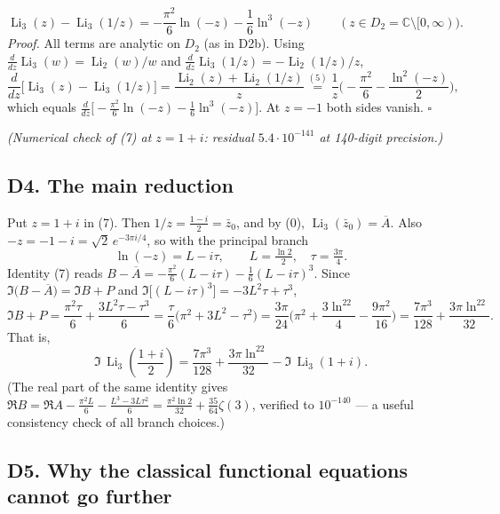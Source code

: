 \documentclass[11pt]{article}
\theoremstyle{remark}
\begin{document}
\begin{equation*}
\operatorname{Li}_3(z)-\operatorname{Li}_3(1/z)=-\frac{\pi^2}{6}\ln(-z)-\frac16\ln^3(-z)\qquad (z\in D_2=\mathbb{C}\setminus[0,\infty)). \tag{7}
\end{equation*}
\emph{Proof.} All terms are analytic on $D_2$ (as in D2b). Using $\tfrac{d}{dz}\operatorname{Li}_3(w)=\operatorname{Li}_2(w)/w$ and $\tfrac{d}{dz}\operatorname{Li}_3(1/z)=-\operatorname{Li}_2(1/z)/z$,
\[
\frac{d}{dz}\Big[\operatorname{Li}_3(z)-\operatorname{Li}_3(1/z)\Big]=\frac{\operatorname{Li}_2(z)+\operatorname{Li}_2(1/z)}{z}
\overset{(5)}{=}\frac1z\Big(-\frac{\pi^2}{6}-\frac{\ln^2(-z)}{2}\Big),
\]
which equals $\tfrac{d}{dz}\big[-\tfrac{\pi^2}6\ln(-z)-\tfrac16\ln^3(-z)\big]$. At $z=-1$ both sides vanish. $\square$

\emph{(Numerical check of (7) at $z=1+i$: residual $5.4\cdot10^{-141}$ at 140-digit precision.)}

\subsection*{D4. The main reduction}

Put $z=1+i$ in (7). Then $1/z=\tfrac{1-i}2=\bar z_0$, and by (0), $\operatorname{Li}_3(\bar z_0)=\overline A$. Also $-z=-1-i=\sqrt2\,e^{-3\pi i/4}$, so with the principal branch
\[
\ln(-z)=L-i\tau,\qquad L=\tfrac{\ln 2}{2},\quad \tau=\tfrac{3\pi}{4}.
\]
Identity (7) reads $B-\overline A=-\tfrac{\pi^2}6(L-i\tau)-\tfrac16(L-i\tau)^3$. Since $\Im\big(B-\overline A\big)=\Im B+P$ and $\Im\big[(L-i\tau)^3\big]=-3L^2\tau+\tau^3$,
\[
\Im B+P=\frac{\pi^2\tau}{6}+\frac{3L^2\tau-\tau^3}{6}
=\frac{\tau}{6}\Big(\pi^2+3L^2-\tau^2\Big)
=\frac{3\pi}{24}\Big(\pi^2+\frac{3\ln^22}{4}-\frac{9\pi^2}{16}\Big)
=\frac{7\pi^3}{128}+\frac{3\pi\ln^22}{32}.
\]
That is,
\begin{equation*}
\Im\,\operatorname{Li}_3\!\left(\frac{1+i}{2}\right)=\frac{7\pi^3}{128}+\frac{3\pi\ln^22}{32}-\Im\,\operatorname{Li}_3(1+i). \tag{8}
\end{equation*}
(The real part of the same identity gives $\Re B=\Re A-\tfrac{\pi^2L}{6}-\tfrac{L^3-3L\tau^2}{6}=\tfrac{\pi^2\ln2}{32}+\tfrac{35}{64}\zeta(3)$, verified to $10^{-140}$ --- a useful consistency check of all branch choices.)

\subsection*{D5. Why the classical functional equations cannot go further}
\end{document}
